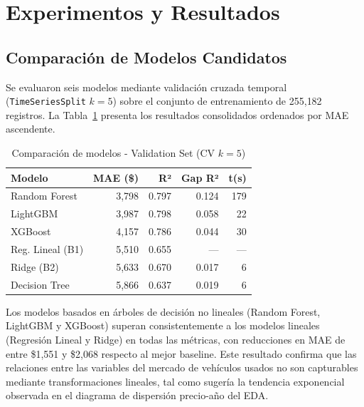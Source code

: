\documentclass[conference]{IEEEtran}
\begin{document}
\section{Experimentos y Resultados}
\label{sec:resultados}

\subsection{Comparación de Modelos Candidatos}
\label{subsec:comparacion}

Se evaluaron seis modelos mediante validación cruzada temporal (\texttt{TimeSeriesSplit} $k{=}5$) sobre el conjunto de entrenamiento de 255{,}182 registros. La Tabla~\ref{tab:modelos} presenta los resultados consolidados ordenados por MAE ascendente.

\begin{table}[H]
    \centering
    \caption{Comparación de modelos - Validation Set (CV $k{=}5$)}
    \label{tab:modelos}
    \begin{tabular}{lrrrr}
        \toprule
        \textbf{Modelo} & \textbf{MAE (\$)} & \textbf{R²} & \textbf{Gap R²} & \textbf{t(s)} \\
        \midrule
        Random Forest        & 3{,}798 & 0.797 & 0.124 & 179 \\
        LightGBM             & 3{,}987 & 0.798 & 0.058 & 22  \\
        XGBoost              & 4{,}157 & 0.786 & 0.044 & 30  \\
        Reg. Lineal (B1)     & 5{,}510 & 0.655 & —     & —   \\
        Ridge (B2)           & 5{,}633 & 0.670 & 0.017 & 6   \\
        Decision Tree        & 5{,}866 & 0.637 & 0.019 & 6   \\
        \bottomrule
    \end{tabular}
\end{table}

Los modelos basados en árboles de decisión no lineales (Random Forest, LightGBM y XGBoost) superan consistentemente a los modelos lineales (Regresión Lineal y Ridge) en todas las métricas, con reducciones en MAE de entre \$1{,}551 y \$2{,}068 respecto al mejor baseline. Este resultado confirma que las relaciones entre las variables del mercado de vehículos usados no son capturables mediante transformaciones lineales, tal como sugería la tendencia exponencial observada en el diagrama de dispersión precio-año del EDA.
\end{document}
